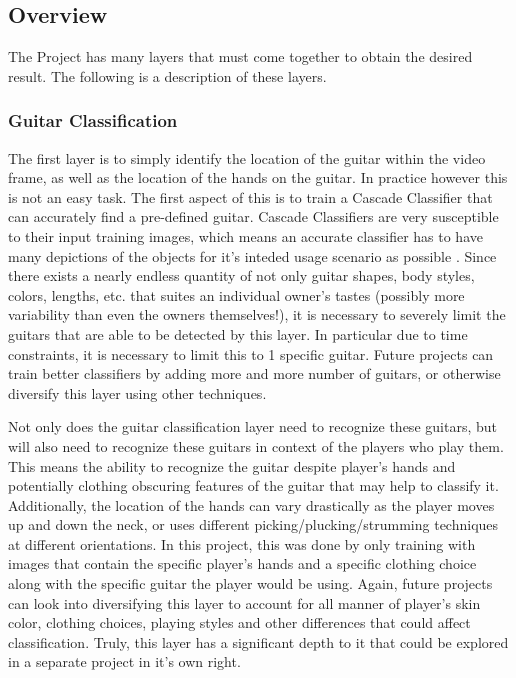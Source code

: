 \subsection{Overview}
The \project Project has many layers that must come together to obtain the desired result.
The following is a description of these layers.
\subsubsection{Guitar Classification}
The first layer is to simply identify the location of the guitar within the video frame,
as well as the location of the hands on the guitar.
In practice however this is not an easy task.
The first aspect of this is to train a Cascade Classifier that can accurately find a pre-defined guitar.
Cascade Classifiers are very susceptible to their input training images,
which means an accurate classifier has to have many depictions of the objects
for it's inteded usage scenario as possible \cite{opencv,codingrobin}.
Since there exists a nearly endless quantity of not only guitar shapes, body styles, colors, lengths, etc.
that suites an individual owner's tastes (possibly more variability than even the owners themselves!),
it is necessary to severely limit the guitars that are able to be detected by this layer.
In particular due to time constraints, it is necessary to limit this to 1 specific guitar.
Future projects can train better classifiers by adding more and more number of guitars,
or otherwise diversify this layer using other techniques.
\par
Not only does the guitar classification layer need to recognize these guitars,
but will also need to recognize these guitars in context of the players who play them.
This means the ability to recognize the guitar despite player's hands and potentially clothing obscuring
features of the guitar that may help to classify it.
Additionally, the location of the hands can vary drastically as the player moves up and down the neck,
or uses different picking/plucking/strumming techniques at different orientations.
In this project, this was done by only training with images that contain the specific player's hands
and a specific clothing choice along with the specific guitar the player would be using.
Again, future projects can look into diversifying this layer to account for all manner of player's
skin color, clothing choices, playing styles and other differences that could affect classification.
Truly, this layer has a significant depth to it that could be explored in a separate project in it's own right.
